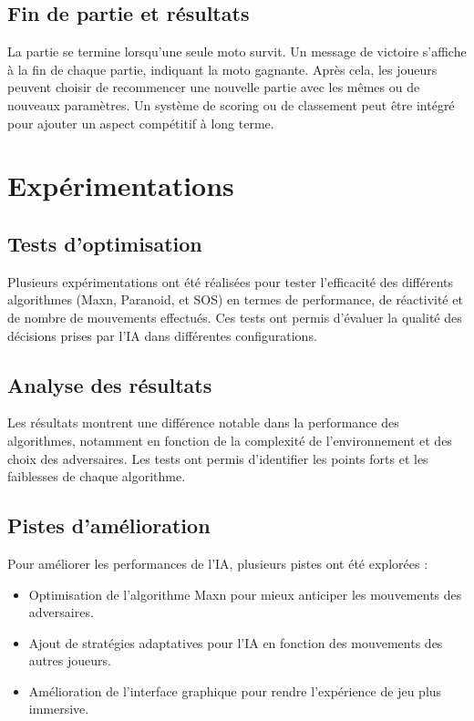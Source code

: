\documentclass[a4paper,12pt]{article}
\begin{document}
\subsection{Fin de partie et résultats}
La partie se termine lorsqu'une seule moto survit. Un message de victoire s'affiche à la fin de chaque partie, indiquant la moto gagnante. Après cela, les joueurs peuvent choisir de recommencer une nouvelle partie avec les mêmes ou de nouveaux paramètres. Un système de scoring ou de classement peut être intégré pour ajouter un aspect compétitif à long terme.
\newpage


\newpage

\section{Expérimentations}

\subsection{Tests d’optimisation}
Plusieurs expérimentations ont été réalisées pour tester l’efficacité des différents algorithmes (Maxn, Paranoid, et SOS) en termes de performance, de réactivité et de nombre de mouvements effectués. Ces tests ont permis d’évaluer la qualité des décisions prises par l’IA dans différentes configurations.

\subsection{Analyse des résultats}
Les résultats montrent une différence notable dans la performance des algorithmes, notamment en fonction de la complexité de l’environnement et des choix des adversaires. Les tests ont permis d’identifier les points forts et les faiblesses de chaque algorithme.

\subsection{Pistes d’amélioration}
Pour améliorer les performances de l’IA, plusieurs pistes ont été explorées :
\begin{itemize}
    \item Optimisation de l’algorithme Maxn pour mieux anticiper les mouvements des adversaires.
    \item Ajout de stratégies adaptatives pour l’IA en fonction des mouvements des autres joueurs.
    \item Amélioration de l’interface graphique pour rendre l’expérience de jeu plus immersive.
\end{itemize}
\end{document}
